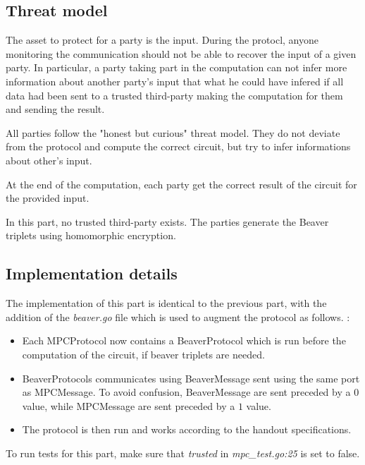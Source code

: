 \documentclass[10pt,conference]{IEEEtran}
\begin{document}
\subsection{Threat model}
The asset to protect for a party is the input. During the protocl, anyone monitoring the communication should not be able to recover the input of a given party. In particular, a party taking part in the computation can not infer more information about another party's input that what he could have infered if all data had been sent to a trusted third-party making the computation for them and sending the result.

All parties follow the "honest but curious" threat model. They do not deviate from the protocol and compute the correct circuit, but try to infer informations about other's input.

At the end of the computation, each party get the correct result of the circuit for the provided input.

In this part, no trusted third-party exists. The parties generate the Beaver triplets using homomorphic encryption.
\subsection{Implementation details}
The implementation of this part is identical to the previous part, with the addition of the \textit{beaver.go} file which is used to augment the protocol as follows. : 
\begin{itemize}
    \item Each MPCProtocol now contains a BeaverProtocol which is run before the computation of the circuit, if beaver triplets are needed.
    \item BeaverProtocols communicates using BeaverMessage sent using the same port as MPCMessage. To avoid confusion, BeaverMessage are sent preceded by a $0$ value, while MPCMessage are sent preceded by a $1$ value.
    \item The protocol is then run and works according to the handout specifications.
\end{itemize}

To run tests for this part, make sure that \textit{trusted} in \textit{mpc\_test.go:25} is set to false.
\end{document}
